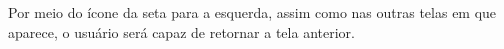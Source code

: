 Por meio do ícone da seta para a esquerda, assim como nas outras telas em que aparece, o usuário será capaz de retornar a tela anterior. 

